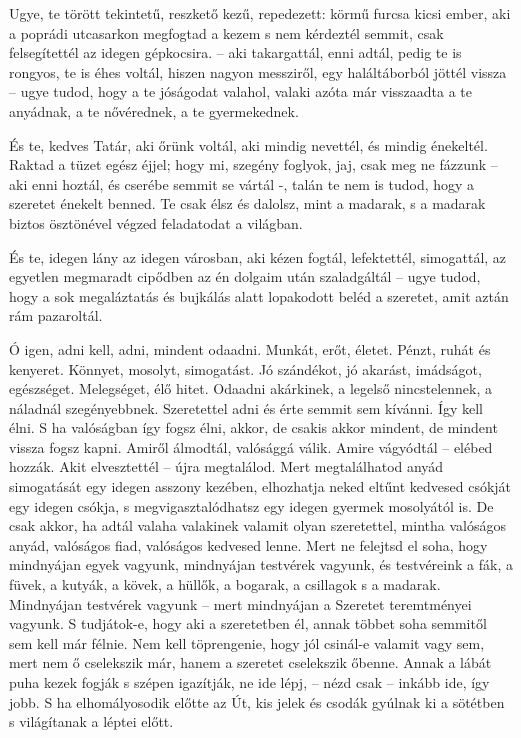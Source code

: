 \documentclass{IEEEtran}
\begin{document}
Ugye, te törött tekintetű, reszkető kezű, repedezett: körmű furcsa kicsi
ember, aki a poprádi utcasarkon megfogtad a kezem s nem kérdeztél semmit, csak
felsegítettél az idegen gépkocsira. – aki takargattál, enni adtál, pedig te is
rongyos, te is éhes voltál, hiszen nagyon messziről, egy haláltáborból jöttél
vissza – ugye tudod, hogy a te jóságodat valahol, valaki azóta már visszaadta
a te anyádnak, a te nővérednek, a te gyermekednek.

És te, kedves Tatár, aki őrünk voltál, aki mindig nevettél, és mindig
énekeltél. Raktad a tüzet egész éjjel; hogy mi, szegény foglyok, jaj, csak meg
ne fázzunk – aki enni hoztál, és cserébe semmit se vártál -, talán te nem is
tudod, hogy a szeretet énekelt benned. Te csak élsz és dalolsz, mint a
madarak, s a madarak biztos ösztönével végzed feladatodat a világban.

És te, idegen lány az idegen városban, aki kézen fogtál, lefektettél,
simogattál, az egyetlen megmaradt cipődben az én dolgaim után szaladgáltál –
ugye tudod, hogy a sok megaláztatás és bujkálás alatt lopakodott beléd a
szeretet, amit aztán rám pazaroltál.

Ó igen, adni kell, adni, mindent odaadni. Munkát, erőt, életet. Pénzt, ruhát
és kenyeret. Könnyet, mosolyt, simogatást. Jó szándékot, jó akarást,
imádságot, egészséget. Melegséget, élő hitet. Odaadni akárkinek, a legelső
nincstelennek, a náladnál szegényebbnek. Szeretettel adni és érte semmit sem
kívánni.
Így kell élni.
S ha valóságban így fogsz élni, akkor, de csakis akkor mindent, de mindent
vissza fogsz kapni. Amiről álmodtál, valósággá válik. Amire vágyódtál – elébed
hozzák. Akit elvesztettél – újra megtalálod. Mert megtalálhatod anyád
simogatását egy idegen asszony kezében, elhozhatja neked eltűnt kedvesed
csókját egy idegen csókja, s megvigasztalódhatsz egy idegen gyermek mosolyától
is. De csak akkor, ha adtál valaha valakinek valamit olyan szeretettel, mintha
valóságos anyád, valóságos fiad, valóságos kedvesed lenne.
Mert ne felejtsd el soha, hogy mindnyájan egyek vagyunk, mindnyájan testvérek
vagyunk, és testvéreink a fák, a füvek, a kutyák, a kövek, a hüllők, a
bogarak, a csillagok s a madarak. Mindnyájan testvérek vagyunk – mert
mindnyájan a Szeretet teremtményei vagyunk. S tudjátok-e, hogy aki a
szeretetben él, annak többet soha semmitől sem kell már félnie. Nem kell
töprengenie, hogy jól csinál-e valamit vagy sem, mert nem ő cselekszik már,
hanem a szeretet cselekszik őbenne. Annak a lábát puha kezek fogják s szépen
igazítják, ne ide lépj, – nézd csak – inkább ide, így jobb. S ha
elhomályosodik előtte az Út, kis jelek és csodák gyúlnak ki a sötétben s
világítanak a léptei előtt.
\end{document}
